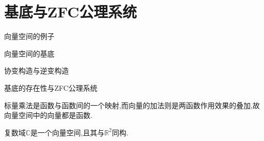 \section{基底与ZFC公理系统}
\renewcommand{\introductionname}{小~节~提~要}
\begin{introduction}
  \item 向量空间的例子
  \item 向量空间的基底
  \item 协变构造与逆变构造
  \item 基底的存在性与ZFC公理系统
\end{introduction}
\renewcommand{\introductionname}{章~节~摘~要}
标量乘法是函数与函数间的一个映射,而向量的加法则是两函数作用效果的叠加,故向量空间中的向量都是函数.

\begin{example}
  复数域$\mathbb{C}$是一个向量空间,且其与$\mathbb{R}^2$同构.
\end{example}
